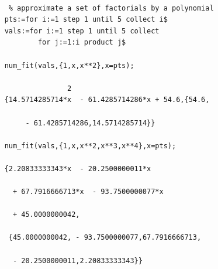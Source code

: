 \begin{verbatim}

     % approximate a set of factorials by a polynomial
    pts:=for i:=1 step 1 until 5 collect i$
    vals:=for i:=1 step 1 until 5 collect
            for j:=1:i product j$

    num_fit(vals,{1,x,x**2},x=pts);

                   2
    {14.5714285714*x  - 61.4285714286*x + 54.6,{54.6,

         - 61.4285714286,14.5714285714}}

    num_fit(vals,{1,x,x**2,x**3,x**4},x=pts);

    {2.20833333343*x  - 20.2500000011*x

      + 67.7916666713*x  - 93.7500000077*x

      + 45.0000000042,

     {45.0000000042, - 93.7500000077,67.7916666713,

      - 20.2500000011,2.20833333343}}
\end{verbatim}

